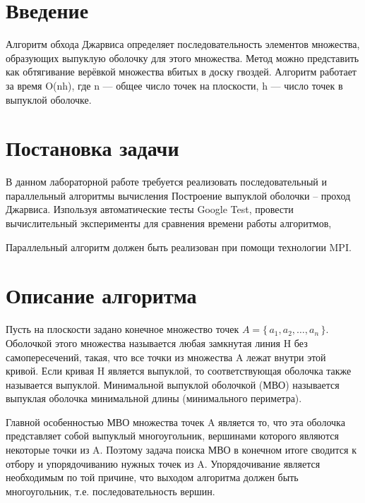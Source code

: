 \documentclass{report}
\begin{document}
\setcounter{page}{2}

\tableofcontents
\newpage

\section*{Введение}
\par Алгоритм обхода Джарвиса определяет последовательность элементов множества, образующих выпуклую оболочку для этого множества. Метод можно представить как обтягивание верёвкой множества вбитых в доску гвоздей. Алгоритм работает за время O(nh), где n — общее число точек на плоскости, h — число точек в выпуклой оболочке.
\newpage

\section*{Постановка задачи}
\par В данном лабораторной работе требуется реализовать последовательный и параллельный алгоритмы вычисления Построение выпуклой оболочки – проход Джарвиса. Изпользуя автоматические тесты Google Test, провести вычислительный эксперименты для сравнения времени работы алгоритмов, 
\par Параллельный алгоритм должен быть реализован при помощи технологии MPI.
\newpage

\section*{Описание алгоритма}
Пусть на плоскости задано конечное множество точек $A=\{\,a_{1},a_{2},\ldots ,a_{n}\,\}$. Оболочкой этого множества называется любая замкнутая линия H без самопересечений, такая, что все точки из множества A лежат внутри этой кривой. Если кривая H является выпуклой, то соответствующая оболочка также называется выпуклой. Минимальной выпуклой оболочкой (МВО) называется выпуклая оболочка минимальной длины (минимального периметра).

\par Главной особенностью МВО множества точек A является то, что эта оболочка представляет собой выпуклый многоугольник, вершинами которого являются некоторые точки из A. Поэтому задача поиска МВО в конечном итоге сводится к отбору и упорядочиванию нужных точек из A. Упорядочивание является необходимым по той причине, что выходом алгоритма должен быть многоугольник, т.е. последовательность вершин. 
\end{document}
